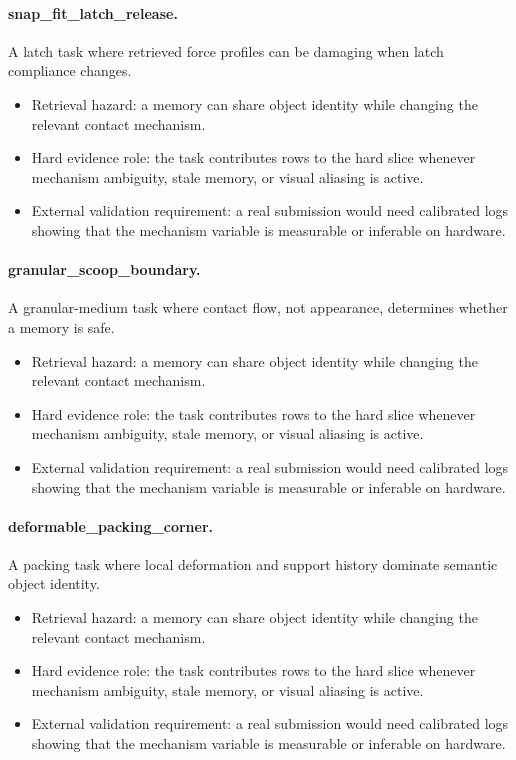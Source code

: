 \documentclass{article}
\begin{document}
\paragraph{snap\_fit\_latch\_release.} A latch task where retrieved force profiles can be damaging when latch compliance changes.
\begin{itemize}
\item Retrieval hazard: a memory can share object identity while changing the relevant contact mechanism.
\item Hard evidence role: the task contributes rows to the hard slice whenever mechanism ambiguity, stale memory, or visual aliasing is active.
\item External validation requirement: a real submission would need calibrated logs showing that the mechanism variable is measurable or inferable on hardware.
\end{itemize}
\paragraph{granular\_scoop\_boundary.} A granular-medium task where contact flow, not appearance, determines whether a memory is safe.
\begin{itemize}
\item Retrieval hazard: a memory can share object identity while changing the relevant contact mechanism.
\item Hard evidence role: the task contributes rows to the hard slice whenever mechanism ambiguity, stale memory, or visual aliasing is active.
\item External validation requirement: a real submission would need calibrated logs showing that the mechanism variable is measurable or inferable on hardware.
\end{itemize}
\paragraph{deformable\_packing\_corner.} A packing task where local deformation and support history dominate semantic object identity.
\begin{itemize}
\item Retrieval hazard: a memory can share object identity while changing the relevant contact mechanism.
\item Hard evidence role: the task contributes rows to the hard slice whenever mechanism ambiguity, stale memory, or visual aliasing is active.
\item External validation requirement: a real submission would need calibrated logs showing that the mechanism variable is measurable or inferable on hardware.
\end{itemize}
\end{document}
